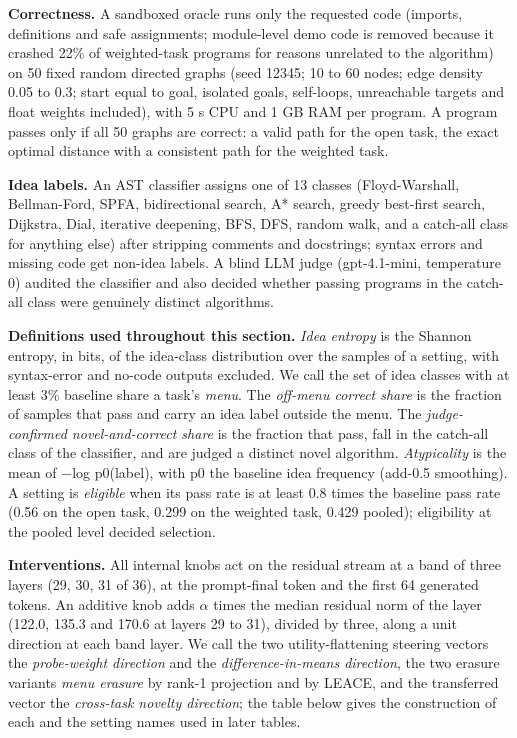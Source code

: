 \documentclass[11pt,letterpaper]{article}
\begin{document}
\textbf{Correctness.} A sandboxed oracle runs only the requested code (imports, definitions and safe assignments; module-level demo code is removed because it crashed 22\% of weighted-task programs for reasons unrelated to the algorithm) on 50 fixed random directed graphs (seed 12345; 10 to 60 nodes; edge density 0.05 to 0.3; start equal to goal, isolated goals, self-loops, unreachable targets and float weights included), with 5 s CPU and 1 GB RAM per program. A program passes only if all 50 graphs are correct: a valid path for the open task, the exact optimal distance with a consistent path for the weighted task.

\textbf{Idea labels.} An AST classifier assigns one of 13 classes (Floyd-Warshall, Bellman-Ford, SPFA, bidirectional search, A* search, greedy best-first search, Dijkstra, Dial, iterative deepening, BFS, DFS, random walk, and a catch-all class for anything else) after stripping comments and docstrings; syntax errors and missing code get non-idea labels. A blind LLM judge (gpt-4.1-mini, temperature 0) audited the classifier and also decided whether passing programs in the catch-all class were genuinely distinct algorithms.

\textbf{Definitions used throughout this section.} \emph{Idea entropy} is the Shannon entropy, in bits, of the idea-class distribution over the samples of a setting, with syntax-error and no-code outputs excluded. We call the set of idea classes with at least 3\% baseline share a task's \emph{menu}. The \emph{off-menu correct share} is the fraction of samples that pass and carry an idea label outside the menu. The \emph{judge-confirmed novel-and-correct share} is the fraction that pass, fall in the catch-all class of the classifier, and are judged a distinct novel algorithm. \emph{Atypicality} is the mean of \ensuremath{-}log p0(label), with p0 the baseline idea frequency (add-0.5 smoothing). A setting is \emph{eligible} when its pass rate is at least 0.8 times the baseline pass rate (0.56 on the open task, 0.299 on the weighted task, 0.429 pooled); eligibility at the pooled level decided selection.

\textbf{Interventions.} All internal knobs act on the residual stream at a band of three layers (29, 30, 31 of 36), at the prompt-final token and the first 64 generated tokens. An additive knob adds \ensuremath{\alpha} times the median residual norm of the layer (122.0, 135.3 and 170.6 at layers 29 to 31), divided by three, along a unit direction at each band layer. We call the two utility-flattening steering vectors the \emph{probe-weight direction} and the \emph{difference-in-means direction}, the two erasure variants \emph{menu erasure} by rank-1 projection and by LEACE, and the transferred vector the \emph{cross-task novelty direction}; the table below gives the construction of each and the setting names used in later tables.
\end{document}
